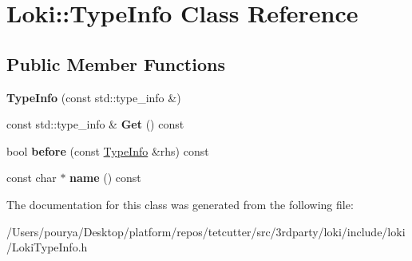 \hypertarget{classLoki_1_1TypeInfo}{}\section{Loki\+:\+:Type\+Info Class Reference}
\label{classLoki_1_1TypeInfo}
\subsection*{Public Member Functions}
\begin{DoxyCompactItemize}
\item 
\hypertarget{classLoki_1_1TypeInfo_a42fe2c6f366015ca70f93257e4ab95db}{}{\bfseries Type\+Info} (const std\+::type\+\_\+info \&)\label{classLoki_1_1TypeInfo_a42fe2c6f366015ca70f93257e4ab95db}

\item 
\hypertarget{classLoki_1_1TypeInfo_a50b5b6154f190e2fc0cfa4edaa006109}{}const std\+::type\+\_\+info \& {\bfseries Get} () const \label{classLoki_1_1TypeInfo_a50b5b6154f190e2fc0cfa4edaa006109}

\item 
\hypertarget{classLoki_1_1TypeInfo_aa8c8335a706e97632c1735826e20997c}{}bool {\bfseries before} (const \hyperlink{classLoki_1_1TypeInfo}{Type\+Info} \&rhs) const \label{classLoki_1_1TypeInfo_aa8c8335a706e97632c1735826e20997c}

\item 
\hypertarget{classLoki_1_1TypeInfo_a526d5880cde7990cde678aeb1401dbc8}{}const char $\ast$ {\bfseries name} () const \label{classLoki_1_1TypeInfo_a526d5880cde7990cde678aeb1401dbc8}

\end{DoxyCompactItemize}


The documentation for this class was generated from the following file\+:\begin{DoxyCompactItemize}
\item 
/\+Users/pourya/\+Desktop/platform/repos/tetcutter/src/3rdparty/loki/include/loki/Loki\+Type\+Info.\+h\end{DoxyCompactItemize}
